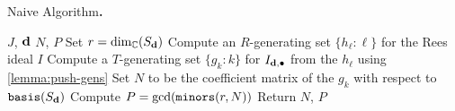 \documentclass[fleqn,reqno]{amsart}
\begin{document}
\begin{algorithm} {\sc Naive Algorithm\bf.}
\label{algo:naive}
\begin{algorithmic}
   $J$, $\mathbf d$
   $N$, $P$
  \State Set $r=\dim_{\mathbb{C}}(S_{\mathbf d})$
  \State Compute an $R$-generating set $\{h_\ell:\ell\}$ for the Rees ideal $I$
  \State Compute a $T$-generating set $\{g_k:k\}$ for $I_{\mathbf d,\bullet}$ from the $h_\ell$
  	using \eqref{lemma:push-gens}
  \State Set $N$ to be the coefficient matrix of the $g_k$ with respect to $\mathop{\tt basis}(S_\mathbf d)$
  \State Compute $P=\gcd(\mathop{\tt minors}(r,N))$
  \State Return $N$, $P$
\end{algorithmic}
\end{algorithm}
\end{document}
